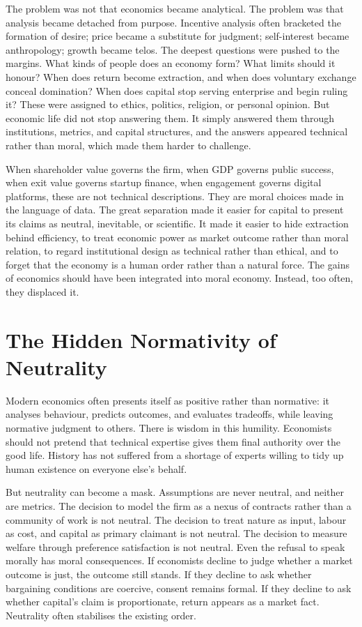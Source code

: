 \documentclass[11pt,a4paper,oneside]{book}
\begin{document}
The problem was not that economics became analytical. The problem was that analysis became detached from purpose. Incentive analysis often bracketed the formation of desire; price became a substitute for judgment; self-interest became anthropology; growth became telos. The deepest questions were pushed to the margins. What kinds of people does an economy form? What limits should it honour? When does return become extraction, and when does voluntary exchange conceal domination? When does capital stop serving enterprise and begin ruling it? These were assigned to ethics, politics, religion, or personal opinion. But economic life did not stop answering them. It simply answered them through institutions, metrics, and capital structures, and the answers appeared technical rather than moral, which made them harder to challenge.

When shareholder value governs the firm, when GDP governs public success, when exit value governs startup finance, when engagement governs digital platforms, these are not technical descriptions. They are moral choices made in the language of data. The great separation made it easier for capital to present its claims as neutral, inevitable, or scientific. It made it easier to hide extraction behind efficiency, to treat economic power as market outcome rather than moral relation, to regard institutional design as technical rather than ethical, and to forget that the economy is a human order rather than a natural force. The gains of economics should have been integrated into moral economy. Instead, too often, they displaced it.

\section*{The Hidden Normativity of Neutrality}

Modern economics often presents itself as positive rather than normative: it analyses behaviour, predicts outcomes, and evaluates tradeoffs, while leaving normative judgment to others. There is wisdom in this humility. Economists should not pretend that technical expertise gives them final authority over the good life. History has not suffered from a shortage of experts willing to tidy up human existence on everyone else's behalf.

But neutrality can become a mask. Assumptions are never neutral, and neither are metrics. The decision to model the firm as a nexus of contracts rather than a community of work is not neutral. The decision to treat nature as input, labour as cost, and capital as primary claimant is not neutral. The decision to measure welfare through preference satisfaction is not neutral. Even the refusal to speak morally has moral consequences. If economists decline to judge whether a market outcome is just, the outcome still stands. If they decline to ask whether bargaining conditions are coercive, consent remains formal. If they decline to ask whether capital's claim is proportionate, return appears as a market fact. Neutrality often stabilises the existing order.
\end{document}
